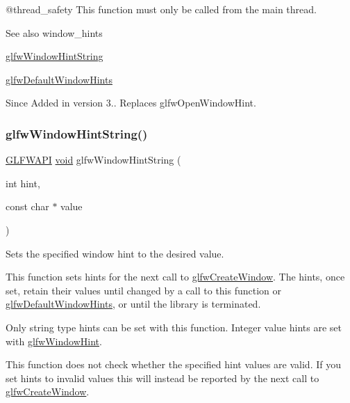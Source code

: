 @thread\+\_\+safety This function must only be called from the main thread.

\begin{DoxySeeAlso}{See also}
window\+\_\+hints 

\mbox{\hyperlink{group__window_ga3c2270562d7ba13d92680ba1090adafe}{glfw\+Window\+Hint\+String}} 

\mbox{\hyperlink{group__window_ga8050ddceed9dc6bd9d3aa35666195cd4}{glfw\+Default\+Window\+Hints}}
\end{DoxySeeAlso}
\begin{DoxySince}{Since}
Added in version 3.. Replaces {\ttfamily glfw\+Open\+Window\+Hint}. 
\end{DoxySince}
\mbox{\label{group__window_ga3c2270562d7ba13d92680ba1090adafe}} 
\subsubsection{\texorpdfstring{glfwWindowHintString()}{glfwWindowHintString()}}
{\footnotesize\ttfamily \mbox{\hyperlink{glfw3_8h_a56da5036b2cc259351ae22fd6439bb47}{G\+L\+F\+W\+A\+PI}} \mbox{\hyperlink{glad_8h_a950fc91edb4504f62f1c577bf4727c29}{void}} glfw\+Window\+Hint\+String (\begin{DoxyParamCaption}\item[{int}]{hint,  }\item[{const char $\ast$}]{value }\end{DoxyParamCaption})}



Sets the specified window hint to the desired value. 

This function sets hints for the next call to \mbox{\hyperlink{group__window_ga680a02abe0e4494b6759d5703240713e}{glfw\+Create\+Window}}. The hints, once set, retain their values until changed by a call to this function or \mbox{\hyperlink{group__window_ga8050ddceed9dc6bd9d3aa35666195cd4}{glfw\+Default\+Window\+Hints}}, or until the library is terminated.

Only string type hints can be set with this function. Integer value hints are set with \mbox{\hyperlink{group__window_ga69c40728499720bef8a49aa925ea0efa}{glfw\+Window\+Hint}}.

This function does not check whether the specified hint values are valid. If you set hints to invalid values this will instead be reported by the next call to \mbox{\hyperlink{group__window_ga680a02abe0e4494b6759d5703240713e}{glfw\+Create\+Window}}.

